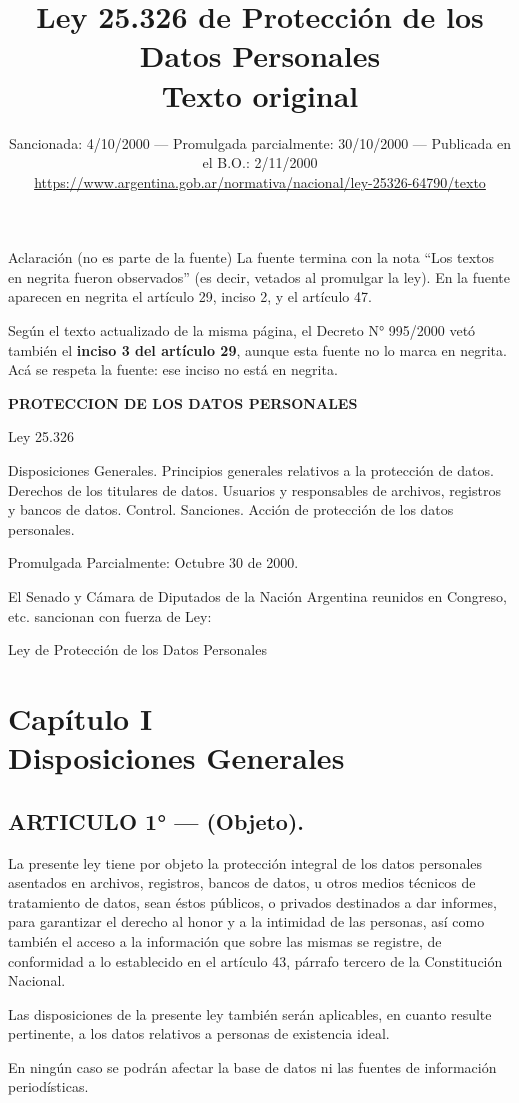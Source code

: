 \documentclass[10pt,a4paper]{article}
\title{\vspace{-1.5cm}\textbf{Ley 25.326 de Protección de los Datos Personales}\\[3pt]
  \large Texto original}
\author{\normalsize Sancionada: 4/10/2000 --- Promulgada parcialmente: 30/10/2000 --- Publicada en el B.O.: 2/11/2000\\[2pt]
  \small\url{https://www.argentina.gob.ar/normativa/nacional/ley-25326-64790/texto}}
\date{}
\newcommand{\capitulo}[2]{\section[#1 --- #2]{#1\\[2pt]#2}}
\newcommand{\articulo}[1]{\subsection{#1}}
\begin{document}
\maketitle

\begin{aviso}{Aclaración (no es parte de la fuente)}
La fuente termina con la nota ``Los textos en negrita fueron observados'' (es decir, vetados al promulgar la ley). En la fuente aparecen en negrita el artículo 29, inciso 2, y el artículo 47.

Según el texto actualizado de la misma página, el Decreto N° 995/2000 vetó también el \textbf{inciso 3 del artículo 29}, aunque esta fuente no lo marca en negrita. Acá se respeta la fuente: ese inciso no está en negrita.
\end{aviso}


{\small\indice}
\clearpage

\textbf{PROTECCION DE LOS DATOS PERSONALES}

Ley 25.326

Disposiciones Generales. Principios generales relativos a la protección de datos. Derechos de los titulares de datos. Usuarios y responsables de archivos, registros y bancos de datos. Control. Sanciones. Acción de protección de los datos personales.

Promulgada Parcialmente: Octubre 30 de 2000.

\begin{center}El Senado y Cámara de Diputados de la Nación Argentina reunidos en Congreso, etc. sancionan con fuerza de Ley:\end{center}
\begin{center}Ley de Protección de los Datos Personales\end{center}
\capitulo{Capítulo I}{Disposiciones Generales}
\articulo{ARTICULO 1° — (Objeto).}
La presente ley tiene por objeto la protección integral de los datos personales asentados en archivos, registros, bancos de datos, u otros medios técnicos de tratamiento de datos, sean éstos públicos, o privados destinados a dar informes, para garantizar el derecho al honor y a la intimidad de las personas, así como también el acceso a la información que sobre las mismas se registre, de conformidad a lo establecido en el artículo 43, párrafo tercero de la Constitución Nacional.

Las disposiciones de la presente ley también serán aplicables, en cuanto resulte pertinente, a los datos relativos a personas de existencia ideal.

En ningún caso se podrán afectar la base de datos ni las fuentes de información periodísticas.
\end{document}
